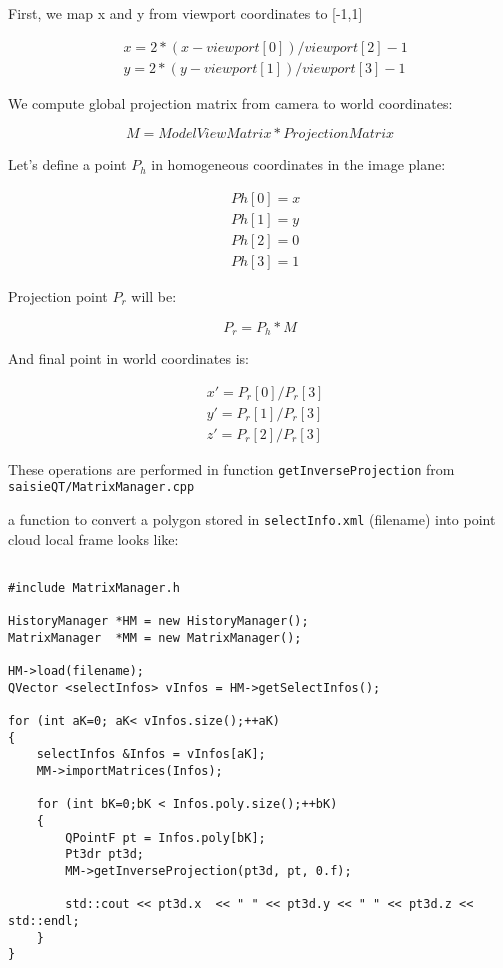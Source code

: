 First, we map x and y from viewport coordinates to [-1,1]

\begin{eqnarray*}
        & x = 2 * ( x - viewport[0] ) / viewport[2] - 1\\
    & y = 2 * ( y - viewport[1] ) / viewport[3] - 1
\end{eqnarray*}

We compute global projection matrix from camera to world coordinates:

\begin{equation*}
        M  = ModelViewMatrix * ProjectionMatrix
\end{equation*}

Let's define a point $P_h$ in homogeneous coordinates in the image plane:

\begin{eqnarray*}
        & Ph[0] = x\\
        & Ph[1] = y\\
        & Ph[2] = 0\\
        & Ph[3] = 1
\end{eqnarray*}

Projection point $P_r$ will be:

\begin{equation*}
        P_r = P_h*M
\end{equation*}

And final point in world coordinates is:

\begin{eqnarray*}
        & x' = P_{r}[0]/P_{r}[3] \\
        & y' = P_{r}[1]/P_{r}[3] \\
        & z' = P_{r}[2]/P_{r}[3]
\end{eqnarray*}


These operations are performed in function {\tt getInverseProjection} from {\tt saisieQT/MatrixManager.cpp }

a function to convert a polygon stored in {\tt selectInfo.xml} (filename) into point cloud local frame looks like:

\begin{verbatim}

#include MatrixManager.h

HistoryManager *HM = new HistoryManager();
MatrixManager  *MM = new MatrixManager();

HM->load(filename);
QVector <selectInfos> vInfos = HM->getSelectInfos();

for (int aK=0; aK< vInfos.size();++aK)
{
    selectInfos &Infos = vInfos[aK];
    MM->importMatrices(Infos);

    for (int bK=0;bK < Infos.poly.size();++bK)
    {
        QPointF pt = Infos.poly[bK];
        Pt3dr pt3d;
        MM->getInverseProjection(pt3d, pt, 0.f);

        std::cout << pt3d.x  << " " << pt3d.y << " " << pt3d.z << std::endl;
    }
}

\end{verbatim}



